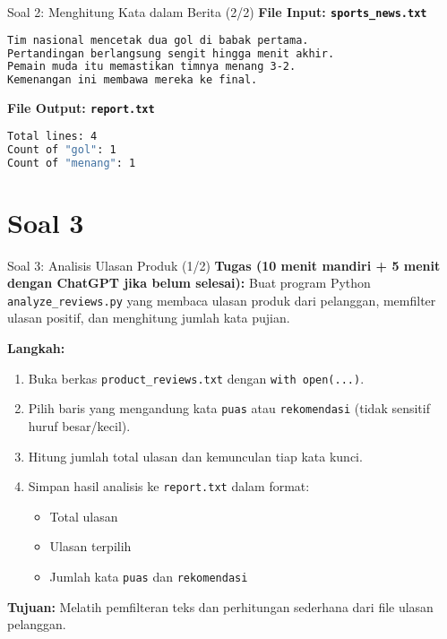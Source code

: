\documentclass[aspectratio=169, table]{beamer}
\begin{document}
\begin{frame}[fragile]{Soal 2: Menghitung Kata dalam Berita (2/2)}
\vspace{15pt}
\textbf{File Input: \texttt{sports\_news.txt}}
\begin{lstlisting}[language=bash,basicstyle=\ttfamily\small]
Tim nasional mencetak dua gol di babak pertama.
Pertandingan berlangsung sengit hingga menit akhir.
Pemain muda itu memastikan timnya menang 3-2.
Kemenangan ini membawa mereka ke final.
\end{lstlisting}

\textbf{File Output: \texttt{report.txt}}
\begin{lstlisting}[language=bash,basicstyle=\ttfamily\small]
Total lines: 4
Count of "gol": 1
Count of "menang": 1
\end{lstlisting}
\end{frame}


\section{Soal 3}
\begin{frame}[fragile]{Soal 3: Analisis Ulasan Produk (1/2)}
\vspace{15pt}
\textbf{Tugas (10 menit mandiri + 5 menit dengan ChatGPT jika belum selesai):}  
Buat program Python \texttt{analyze\_reviews.py} yang membaca ulasan produk dari pelanggan, memfilter ulasan positif, dan menghitung jumlah kata pujian.

\textbf{Langkah:}
\begin{enumerate}
  \item Buka berkas \texttt{product\_reviews.txt} dengan \texttt{with open(...)}.
  \item Pilih baris yang mengandung kata \texttt{puas} atau \texttt{rekomendasi}  
        (tidak sensitif huruf besar/kecil).
  \item Hitung jumlah total ulasan dan kemunculan tiap kata kunci.
  \item Simpan hasil analisis ke \texttt{report.txt} dalam format:
        \begin{itemize}
          \item Total ulasan
          \item Ulasan terpilih
          \item Jumlah kata \texttt{puas} dan \texttt{rekomendasi}
        \end{itemize}
\end{enumerate}

\textbf{Tujuan:}  
Melatih pemfilteran teks dan perhitungan sederhana dari file ulasan pelanggan.
\end{frame}
\end{document}
